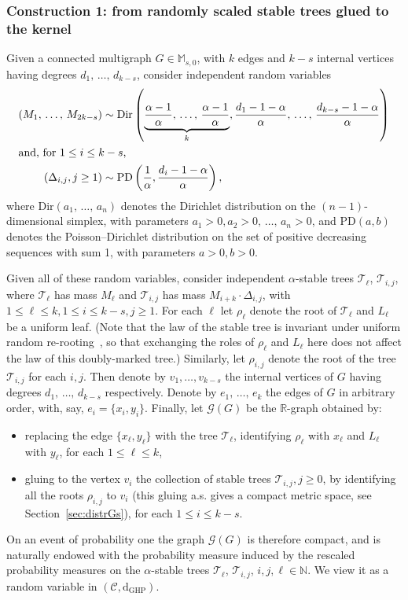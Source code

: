 \documentclass[10pt]{amsart}
\theoremstyle{definition}\newtheorem{defi}[theo]{Definition}\newtheorem{rema}[theo]{Remark}\newtheorem{exam}[theo]{Example}\newtheorem{exem}[theo]{Example}\newtheorem{nota}[theo]{Notation}
\newcommand{\PD}{\mathrm{PD}}
\newcommand{\GHP}{\mathrm{GHP}}
\newcommand{\rmd}{\mathrm{d}}
\newcommand{\Dir}{\mathrm{Dir}}
\newcommand{\cG}{\mathcal{G}}
\newcommand{\cT}{\mathcal{T}}
\newcommand{\scrC}{\mathscr{C}}
\newcommand{\R}{\mathbb{R}}
\newcommand{\M}{\mathbb{M}}
\newcommand{\N}{\mathbb{N}}
\begin{document}
\subsubsection{Construction 1: from randomly scaled stable trees glued to the kernel}\label{cons1:gluing}
Given a connected multigraph $G \in \M_{s,0}$, with $k$ edges and $k-s$ internal vertices having degrees $d_1,\,\ldots,\,d_{k-s}$, consider independent random variables
\begin{align}
\left(M_1,\,\ldots,\,M_{2k-s}\right) &\sim \Dir \left(\underbrace{\frac{\alpha-1}{\alpha},\,\ldots,\,\frac{\alpha-1}{\alpha}}_{k},\frac{d_1-1-\alpha}{\alpha},\,\ldots,\,\frac{d_{k-s}-1-\alpha}{\alpha}\right)\label{distr1}
\\
\intertext{and, for $1 \leq i \leq k-s$,}
\left(\Delta_{i,j}, j \geq 1\right) &\sim \PD\left(\frac{1}{\alpha},\frac{d_i-1-\alpha}{\alpha}\right),\label{distr2}
\end{align}
where $\Dir(a_1,\,\ldots,\,a_n)$ denotes the Dirichlet distribution on the $(n-1)$-dimensional simplex, with parameters $a_1>0,a_2>0,\,\ldots,\,a_n>0$, and $\PD(a,b)$ denotes the Poisson--Dirichlet distribution on the set of positive decreasing sequences with sum 1, with parameters $a>0,b>0$.

Given all of these random variables, consider independent $\alpha$-stable trees $\cT_{\ell}$, $\cT_{i,j}$, where $\cT_{\ell}$ has mass $M_{\ell}$ and $\cT_{i,j}$ has mass $M_{i+k} \cdot \Delta_{i,j}$, with $1 \leq \ell \leq k, 1 \leq i \leq k-s, j \geq 1$. For each $\ell$ let $\rho_\ell$ denote the root of $\cT_{\ell}$ and $L_{\ell}$ be a uniform leaf. (Note that the law of the stable tree is invariant under uniform random re-rooting~\cite{DLG09,HaasPitmanWinkel}, so that exchanging the roles of $\rho_{\ell}$ and $L_{\ell}$ here does not affect the law of this doubly-marked tree.) Similarly, let $\rho_{i,j}$ denote the root of the tree $\cT_{i,j}$ for each $i,j$. Then denote by $v_1,\ldots, v_{k-s}$ the internal vertices of $G$ having degrees $d_1,\,\ldots,\,d_{k-s}$ respectively. Denote by $ e_1,\,\ldots,\,e_{k}$ the edges of $G$ in arbitrary order, with, say, $e_i=\{x_i,y_i\}$. Finally, let $\cG(G)$ be the $\R$-graph obtained by:
\begin{itemize}
\item replacing the edge $\{x_{\ell},y_{\ell}\}$ with the tree $\cT_{\ell}$, identifying $\rho_{\ell}$ with $x_{\ell}$ and $L_{\ell}$ with $y_{\ell}$, for each $1\leq \ell \leq k$,
\item gluing to the vertex $v_i$ the collection of stable trees $\cT_{i,j},j\geq 0$, by identifying all the roots $\rho_{i,j}$ to $v_i$ (this gluing a.s. gives a compact metric space, see Section~\ref{sec:distrGs}), for each $1\leq i \leq k-s$.
\end{itemize}
On an event of probability one the graph $\cG(G)$ is therefore compact, and is naturally endowed with the probability measure induced by the rescaled probability measures on the $\alpha$-stable trees $\cT_{\ell}$, $\cT_{i,j}$, $i,j,\ell \in \N$. We view it as a random variable in $(\scrC,\rmd_{\GHP})$.
\end{document}
